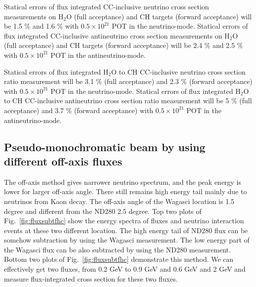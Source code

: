 Statical errors of flux integrated CC-inclusive neutrino cross section measurements on H$_{2}$O (full acceptance) and CH targets (forward acceptance)
will be 1.5 \% and 1.6 \% with $0.5\times 10^{21}$ POT in the neutrino-mode.
Statical errors of flux integrated CC-inclusive antineutrino cross section measurements on H$_{2}$O (full acceptance) and CH targets (forward acceptance)
will be 2.4 \% and 2.5 \% with $0.5\times 10^{21}$ POT in the antineutrino-mode.


Statical errors of flux integrated H$_{2}$O to CH CC-inclusive neutrino cross section ratio measurement 
will be 3.1 \% (full acceptance) and 2.3 \% (forward acceptance) with $0.5\times 10^{21}$ POT in the neutrino-mode.
Statical errors of flux integrated H$_{2}$O to CH CC-inclusive antineutrino cross section ratio measurement will be 5 \% (full acceptance) and 3.7 \% (forward acceptance) with $0.5\times 10^{21}$ POT in the antineutrino-mode.


\subsection{Pseudo-monochromatic beam by using different off-axis fluxes}
The off-axis method gives narrower neutrino spectrum, and the peak energy is lower for larger off-axis angle.
There still remains high energy tail mainly due to neutrinos from Kaon decay.
The off-axis angle of the Wagasci location is 1.5 degree and different from the ND280 2.5 degree.
Top two plots of Fig.~\ref{fig:fluxsubtfhc} show the energy spectra of fluxes and neutrino interaction events
at these two different location.
The high energy tail of ND280 flux can be somehow subtraction by using the Wagasci measurement.
The low energy part of the Wagasci flux can be also subtracted by using the ND280 measurement.
Bottom two plots of Fig.~\ref{fig:fluxsubtfhc} demonstrate this method.
We can effectively get two fluxes, from 0.2 GeV to 0.9 GeV and 0.6 GeV and 2 GeV
and measure flux-integrated cross section for these two fluxes.

